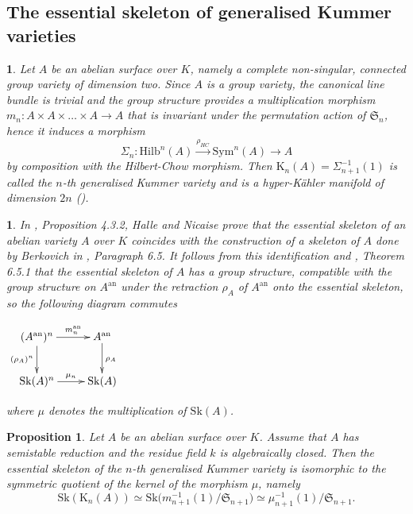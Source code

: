 \documentclass{amsart}%
\numberwithin{equation}{subsection}
\theoremstyle{plain2}
\newtheorem{prop}[equation]{Proposition}
\theoremstyle{definition2}
\theoremstyle{stepstyle}
\theoremstyle{point}
\theoremstyle{subpoint}
\newtheorem{subpoint}[equation]{}%
\newcommand{\spa}[1]{\begin{subpoint}#1\end{subpoint}}           %
\newcommand{\Hilb}{\ensuremath{\mathrm{Hilb}}}
\newcommand{\an}{\mathrm{an}}
\newcommand{\Sk}{\mathrm{Sk}}
\begin{document}
\subsection{The essential skeleton of generalised Kummer varieties} \label{sect essential sk Kummer}
\spa{Let $A$ be an abelian surface over $K$, namely a complete non-singular, connected group variety of dimension two. Since $A$ is a group variety, the canonical line bundle is trivial and the group structure provides a multiplication morphism $m_n: A \times A \times \ldots \times A \rightarrow A$ that is invariant under the permutation action of $\mathfrak{S}_n$, hence it induces a morphism $$\Sigma_n: \Hilb^n(A) \xrightarrow{\rho_{HC}} \text{Sym}^n(A) \rightarrow A$$ by composition with the Hilbert-Chow morphism. Then $\text{K}_n(A) = \Sigma_{n+1}^{-1}(1)$ is called the $n$-th generalised Kummer variety and is a hyper-K\"{a}hler manifold of dimension $2n$ (\cite{Beauville1983}).
}
\spa{In \cite{HalvardHalleNicaise2017}, Proposition 4.3.2, Halle and Nicaise prove that the essential skeleton of an abelian variety $A$ over $K$ coincides with the construction of a skeleton of $A$ done by Berkovich in \cite{Berkovich1990}, Paragraph 6.5. It follows from this identification and \cite{Berkovich1990}, Theorem 6.5.1 that the essential skeleton of $A$ has a group structure, compatible with the group structure on $A^\an$ under the retraction $\rho_A$ of $A^\an$ onto the essential skeleton, so the following diagram commutes
\begin{center}
$\xymatrix{
(A^\an)^n \ar[d]_{(\rho_A)^n} \ar[r]^-{m_n^\an} & A^\an \ar[d]^{\rho_A} \\
\Sk(A)^n \ar[r]^-{\mu_n} & \Sk(A)
}$
\end{center} where $\mu$ denotes the multiplication of $\Sk(A)$.
}
\begin{prop} \label{prop essential skeleton Kummer}
Let $A$ be an abelian surface over $K$. Assume that $A$ has  semistable reduction and the residue field $k$ is algebraically closed. Then the essential skeleton of the $n$-th generalised Kummer variety is isomorphic to the symmetric quotient of the kernel of the morphism $\mu$, namely $$\Sk(\text{K}_n(A)) \simeq \Sk\big(m_{n+1}^{-1}(1)/\mathfrak{S}_{n+1}\big) \simeq \mu_{n+1}^{-1}(1)/\mathfrak{S}_{n+1}.$$ 
\end{prop}
\end{document}
